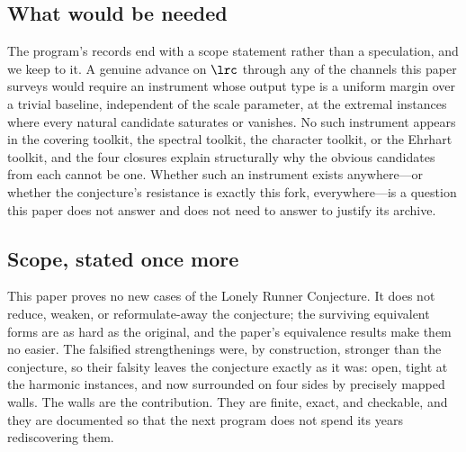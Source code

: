\subsection{What would be needed}

The program's records end with a scope statement rather than a
speculation, and we keep to it. A genuine advance on $\lrc$ through any
of the channels this paper surveys would require an instrument whose
output type is a uniform margin over a trivial baseline, independent of
the scale parameter, at the extremal instances where every natural
candidate saturates or vanishes. No such instrument appears in the
covering toolkit, the spectral toolkit, the character toolkit, or the
Ehrhart toolkit, and the four closures explain structurally why the
obvious candidates from each cannot be one. Whether such an instrument
exists anywhere---or whether the conjecture's resistance is exactly this
fork, everywhere---is a question this paper does not answer and does
not need to answer to justify its archive.

\subsection{Scope, stated once more}

This paper proves no new cases of the Lonely Runner Conjecture. It does
not reduce, weaken, or reformulate-away the conjecture; the surviving
equivalent forms are as hard as the original, and the paper's
equivalence results make them no easier. The falsified strengthenings
were, by construction, stronger than the conjecture, so their falsity
leaves the conjecture exactly as it was: open, tight at the harmonic
instances, and now surrounded on four sides by precisely mapped walls.
The walls are the contribution. They are finite, exact, and checkable,
and they are documented so that the next program does not spend its
years rediscovering them.
